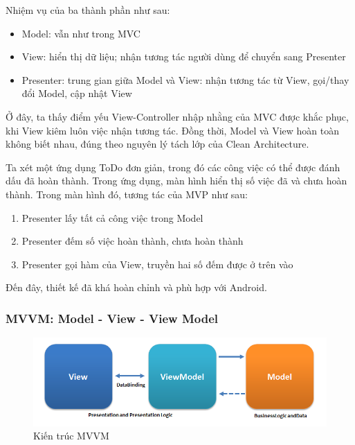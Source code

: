\documentclass[../../thesis]{subfiles}
\begin{document}
Nhiệm vụ của ba thành phần như sau:

\begin{itemize}
    \item
        Model: vẫn như trong MVC
    \item
        View: hiển thị dữ liệu; nhận tương tác người dùng để chuyển sang
        Presenter
    \item
        Presenter: trung gian giữa Model và View: nhận tương tác từ View,
        gọi/thay đổi Model, cập nhật View
\end{itemize}

Ở đây, ta thấy điểm yếu View-Controller nhập nhằng của MVC được khắc phục, khi
View kiêm luôn việc nhận tương tác. Đồng thời, Model và View hoàn toàn không
biết nhau, đúng theo nguyên lý tách lớp của Clean Architecture.

Ta xét một ứng dụng ToDo đơn giản, trong đó các công việc có thể được đánh dấu
đã hoàn thành. Trong ứng dụng, màn hình hiển thị số việc đã và chưa hoàn thành.
Trong màn hình đó, tương tác của MVP như sau:

\begin{enumerate}
    \item
        Presenter lấy tất cả công việc trong Model
    \item
        Presenter đếm số việc hoàn thành, chưa hoàn thành
    \item
        Presenter gọi hàm của View, truyền hai số đếm được ở trên vào
\end{enumerate}

Đến đây, thiết kế đã khá hoàn chỉnh và phù hợp với Android.

\subsubsection{MVVM: Model - View - View Model}

\begin{figure}
    \centering
    \vspace*{-6mm}
    \includegraphics[width=\linewidth]{../images/MVVMPattern.png}
    \vspace*{-10mm}
    \caption{Kiến trúc MVVM \cite{MUN_MVVM}}
    \label{fig:mvvm}
\end{figure}
\end{document}
